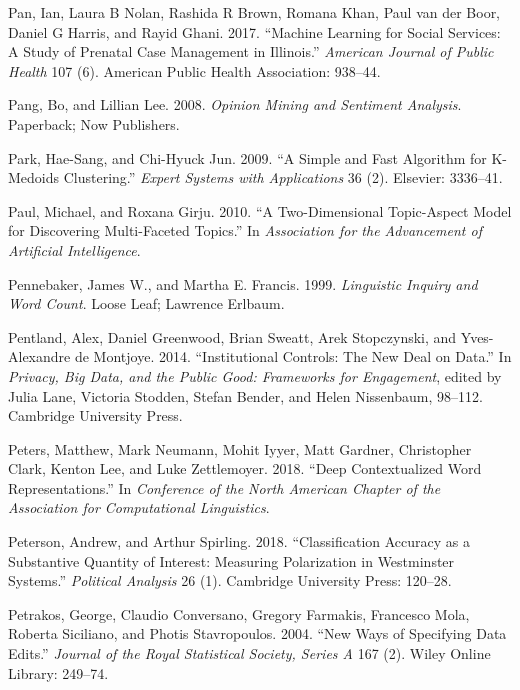 \documentclass[]{krantz}
\begin{document}
\hypertarget{ref-pan2017}{}
Pan, Ian, Laura B Nolan, Rashida R Brown, Romana Khan, Paul van der
Boor, Daniel G Harris, and Rayid Ghani. 2017. ``Machine Learning for
Social Services: A Study of Prenatal Case Management in Illinois.''
\emph{American Journal of Public Health} 107 (6). American Public Health
Association: 938--44.

\hypertarget{ref-pang-08}{}
Pang, Bo, and Lillian Lee. 2008. \emph{Opinion Mining and Sentiment
Analysis}. Paperback; Now Publishers.

\hypertarget{ref-park2009simple}{}
Park, Hae-Sang, and Chi-Hyuck Jun. 2009. ``A Simple and Fast Algorithm
for K-Medoids Clustering.'' \emph{Expert Systems with Applications} 36
(2). Elsevier: 3336--41.

\hypertarget{ref-paul-10}{}
Paul, Michael, and Roxana Girju. 2010. ``A Two-Dimensional Topic-Aspect
Model for Discovering Multi-Faceted Topics.'' In \emph{Association for
the Advancement of Artificial Intelligence}.

\hypertarget{ref-pennebaker-99}{}
Pennebaker, James W., and Martha E. Francis. 1999. \emph{Linguistic
Inquiry and Word Count}. Loose Leaf; Lawrence Erlbaum.

\hypertarget{ref-Pentland2014}{}
Pentland, Alex, Daniel Greenwood, Brian Sweatt, Arek Stopczynski, and
Yves-Alexandre de Montjoye. 2014. ``Institutional Controls: The New Deal
on Data.'' In \emph{Privacy, Big Data, and the Public Good: Frameworks
for Engagement}, edited by Julia Lane, Victoria Stodden, Stefan Bender,
and Helen Nissenbaum, 98--112. Cambridge University Press.

\hypertarget{ref-peters-18}{}
Peters, Matthew, Mark Neumann, Mohit Iyyer, Matt Gardner, Christopher
Clark, Kenton Lee, and Luke Zettlemoyer. 2018. ``Deep Contextualized
Word Representations.'' In \emph{Conference of the North American
Chapter of the Association for Computational Linguistics}.

\hypertarget{ref-peterson2018classification}{}
Peterson, Andrew, and Arthur Spirling. 2018. ``Classification Accuracy
as a Substantive Quantity of Interest: Measuring Polarization in
Westminster Systems.'' \emph{Political Analysis} 26 (1). Cambridge
University Press: 120--28.

\hypertarget{ref-petrakos2004new}{}
Petrakos, George, Claudio Conversano, Gregory Farmakis, Francesco Mola,
Roberta Siciliano, and Photis Stavropoulos. 2004. ``New Ways of
Specifying Data Edits.'' \emph{Journal of the Royal Statistical Society,
Series A} 167 (2). Wiley Online Library: 249--74.
\end{document}
